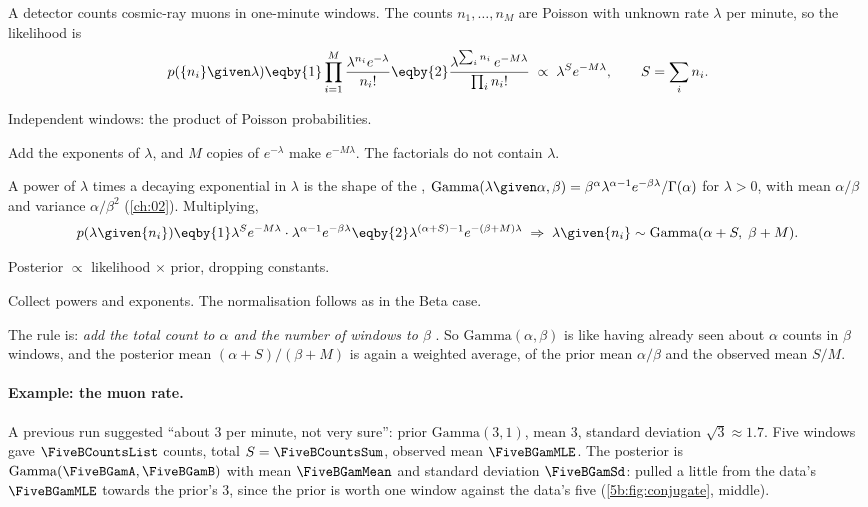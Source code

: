 A detector counts cosmic-ray muons in one-minute windows. The counts $n_1,\dots,n_M$ are
Poisson with unknown rate $\lambda$ per minute, so the likelihood is
\begin{align*}
  p(\{n_i\}\given\lambda)
  \eqby{1}\prod_{i=1}^M\frac{\lambda^{n_i}e^{-\lambda}}{n_i!}
  \eqby{2}\frac{\lambda^{\sum_in_i}\,e^{-M\lambda}}{\prod_in_i!}
  \;\propto\;\lambda^{S}e^{-M\lambda},\qquad S=\sum_in_i .
\end{align*}
\begin{explain}
  \item Independent windows: the product of Poisson probabilities.
  \item Add the exponents of $\lambda$, and $M$ copies of $e^{-\lambda}$ make
        $e^{-M\lambda}$. The factorials do not contain $\lambda$.
\end{explain}
A power of $\lambda$ times a decaying exponential in $\lambda$ is the shape of the
, $\mathrm{Gamma}(\lambda\given\alpha,\beta)=\beta^\alpha
\lambda^{\alpha-1}e^{-\beta\lambda}/\Gamma(\alpha)$ for $\lambda>0$, with mean
$\alpha/\beta$ and variance $\alpha/\beta^2$ (\cref{ch:02}). Multiplying,
\begin{align}
  p(\lambda\given\{n_i\})
  \eqby{1}\lambda^{S}e^{-M\lambda}\cdot\lambda^{\alpha-1}e^{-\beta\lambda}
  \eqby{2}\lambda^{(\alpha+S)-1}e^{-(\beta+M)\lambda}
  \;\Rightarrow\;
  \lambda\given\{n_i\}\sim\mathrm{Gamma}(\alpha+S,\;\beta+M).
  \label{5b:eq:gamma-post}
\end{align}
\begin{explain}
  \item Posterior $\propto$ likelihood $\times$ prior, dropping constants.
  \item Collect powers and exponents. The normalisation follows as in the Beta case.
\end{explain}
The rule is: \emph{add the total count to $\alpha$ and the number of windows to $\beta$}
. So $\mathrm{Gamma}(\alpha,\beta)$ is like having already seen
about $\alpha$ counts in $\beta$ windows, and the posterior mean $(\alpha+S)/(\beta+M)$ is
again a weighted average, of the prior mean $\alpha/\beta$ and the observed mean $S/M$.

\paragraph{Example: the muon rate.}
A previous run suggested ``about 3 per minute, not very sure'': prior
$\mathrm{Gamma}(3,1)$, mean 3, standard deviation $\sqrt3\approx1.7$. Five windows gave
$\FiveBCountsList$ counts, total $S=\FiveBCountsSum$, observed mean $\FiveBGamMLE$. The
posterior is $\mathrm{Gamma}(\FiveBGamA,\FiveBGamB)$ with mean $\FiveBGamMean$ and
standard deviation $\FiveBGamSd$: pulled a little from the data's $\FiveBGamMLE$ towards
the prior's 3, since the prior is worth one window against the data's five
(\cref{5b:fig:conjugate}, middle).

